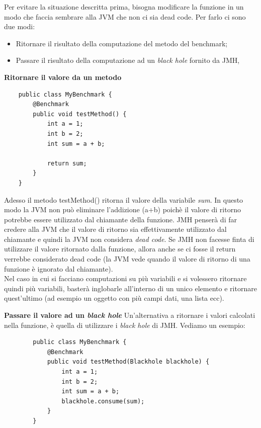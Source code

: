 \documentclass[a4paper, 11pt,            %
openright,               %
italian,
english                 
]{article}       %
\begin{document}
	Per evitare la situazione descritta prima, bisogna modificare la funzione in un modo che faccia sembrare alla JVM che non ci sia dead code. Per farlo ci sono due modi:
	
	\begin{itemize}
		\item Ritornare il risultato della computazione del metodo del benchmark;
		\item Passare il risultato della computazione ad un \textit{black hole} fornito da JMH,
	\end{itemize}

	\textbf{Ritornare il valore da un metodo}
	\\
	
	\begin{lstlisting}
	public class MyBenchmark {
		@Benchmark
		public void testMethod() {
			int a = 1;
			int b = 2;
			int sum = a + b;
			
			return sum;
		}
	}
	\end{lstlisting}
	
	Adesso il metodo testMethod() ritorna il valore della variabile \textit{sum}. In questo modo la JVM non può eliminare l'addizione (a+b) poichè il valore di ritorno potrebbe essere utilizzato dal chiamante della funzione. JMH penserà di far credere alla JVM che il valore di ritorno sia effettivamente utilizzato dal chiamante e quindi la JVM non considera \textit{dead code}. Se JMH non facesse finta di utilizzare il valore ritornato dalla funzione, allora anche se ci fosse il return verrebbe considerato dead code (la JVM vede quando il valore di ritorno di una funzione è ignorato dal chiamante).\\
	
	Nel caso in cui si facciano computazioni su più variabili e si volessero ritornare quindi più variabili, basterà inglobarle all'interno di un unico elemento e ritornare quest'ultimo (ad esempio un oggetto con più campi dati, una lista ecc).
	
	\textbf{Passare il valore ad un \textit{black hole}}
	Un'alternativa a ritornare i valori calcolati nella funzione, è quella di utilizzare i \textit{black hole} di JMH. Vediamo un esempio:
	
	\begin{lstlisting}
		public class MyBenchmark {
			@Benchmark
			public void testMethod(Blackhole blackhole) {
				int a = 1;
				int b = 2;
				int sum = a + b;
				blackhole.consume(sum);
			}
		}
	\end{lstlisting}
	
\end{document}
